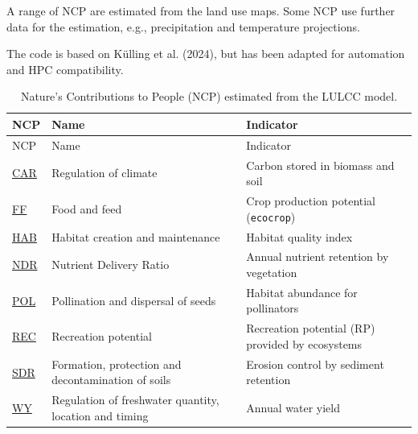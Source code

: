 \documentclass[
  letterpaper,
  DIV=11,
  numbers=noendperiod]{scrreprt}
\begin{document}
A range of NCP are estimated from the land use maps. Some NCP use
further data for the estimation, e.g., precipitation and temperature
projections.

The code is based on Külling et al. (2024), but has been adapted for
automation and HPC compatibility.

\begin{longtable}[]{@{}
  >{\raggedleft\arraybackslash}p{}
  >{\raggedright\arraybackslash}p{}
  >{\raggedright\arraybackslash}p{}@{}}
\caption{Nature's Contributions to People (NCP) estimated from the LULCC
model. }\label{tbl-ncp}\tabularnewline
\toprule\noalign{}
\begin{minipage}[b]{\linewidth}\raggedleft
NCP
\end{minipage} & \begin{minipage}[b]{\linewidth}\raggedright
Name
\end{minipage} & \begin{minipage}[b]{\linewidth}\raggedright
Indicator
\end{minipage} \\
\midrule\noalign{}
\endfirsthead
\toprule\noalign{}
\begin{minipage}[b]{\linewidth}\raggedleft
NCP
\end{minipage} & \begin{minipage}[b]{\linewidth}\raggedright
Name
\end{minipage} & \begin{minipage}[b]{\linewidth}\raggedright
Indicator
\end{minipage} \\
\midrule\noalign{}
\endhead
\bottomrule\noalign{}
\endlastfoot
\hyperref[CAR]{CAR} & Regulation of climate & Carbon stored in biomass
and soil \\
\hyperref[FF]{FF} & Food and feed & Crop production potential
(\texttt{ecocrop}) \\
\hyperref[HAB]{HAB} & Habitat creation and maintenance & Habitat quality
index \\
\hyperref[NDR]{NDR} & Nutrient Delivery Ratio & Annual nutrient
retention by vegetation \\
\hyperref[POL]{POL} & Pollination and dispersal of seeds & Habitat
abundance for pollinators \\
\hyperref[REC]{REC} & Recreation potential & Recreation potential (RP)
provided by ecosystems \\
\hyperref[SDR]{SDR} & Formation, protection and decontamination of soils
& Erosion control by sediment retention \\
\hyperref[WY]{WY} & Regulation of freshwater quantity, location and
timing & Annual water yield \\
\end{longtable}
\end{document}
